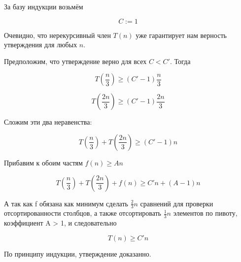 \documentclass[11pt]{article}
\begin{document}
За базу индукции возьмём

\[
	C := 1
\]

Очевидно, что нерекурсивный член $T(n)$ уже гарантирует нам верность утверждения для любых $n$.

Предположим, что утверждение верно для всех $C<C'$. Тогда

\[
	T\left(\frac{n}{3}\right) \geq (C'-1)\frac{n}{3}
\]

\[
	T\left(\frac{2n}{3}\right) \geq (C'-1)\frac{2n}{3}
\]

Сложим эти два неравенства:

\[
	T\left(\frac{n}{3}\right) + T\left(\frac{2n}{3}\right) \geq (C'-1)n
\]

Прибавим к обоим частям $f(n) \geq An$

\[
	T\left(\frac{n}{3}\right) + T\left(\frac{2n}{3}\right) + f(n) \geq C'n + (A-1)n
\]

А так как f обязана как минимум сделать $\frac{2}{3}n$ сравнений для проверки отсортированности столбцов, а также отсортировать $\frac{1}{3}n$ элементов по пивоту, коэффициент A > 1, и следовательно 

\[
	T\left(n\right) \geq C'n
\]

По принципу индукции, утверждение доказанно.
\end{document}
